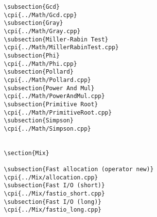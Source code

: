 {\begin{verbatim}
\subsection{Gcd}
\cpi{../Math/Gcd.cpp}
\subsection{Gray}
\cpi{../Math/Gray.cpp}
\subsection{Miller-Rabin Test}
\cpi{../Math/MillerRabinTest.cpp}
\subsection{Phi}
\cpi{../Math/Phi.cpp}
\subsection{Pollard}
\cpi{../Math/Pollard.cpp}
\subsection{Power And Mul}
\cpi{../Math/PowerAndMul.cpp}
\subsection{Primitive Root}
\cpi{../Math/PrimitiveRoot.cpp}
\subsection{Simpson}
\cpi{../Math/Simpson.cpp}


\section{Mix}

\subsection{Fast allocation (operator new)}
\cpi{../Mix/allocation.cpp}
\subsection{Fast I/O (short)}
\cpi{../Mix/fastio_short.cpp}
\subsection{Fast I/O (long)}
\cpi{../Mix/fastio_long.cpp}

\end{verbatim}}
